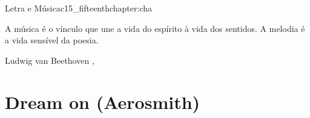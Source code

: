 \begin{chapterpage}{Letra e Música}{c15_fifteenthchapter:cha}

\begin{myquotation}A música é o vínculo que une a vida do espírito à vida dos sentidos. A melodia é a vida sensível da poesia.
 
\par\vspace*{15mm}
\mbox{}\hfill \emdash{}Ludwig van Beethoven 
, %
\par\end{myquotation}

\end{chapterpage}



\section{Dream on (Aerosmith)}\label{c1_basicformatting:sec}

